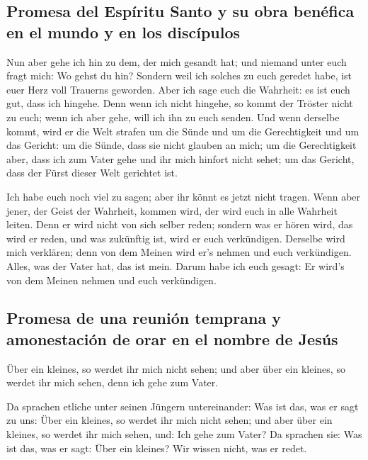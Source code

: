 \hypertarget{promesa-del-espuxedritu-santo-y-su-obra-benuxe9fica-en-el-mundo-y-en-los-discuxedpulos}{%
\subsection{Promesa del Espíritu Santo y su obra benéfica en el mundo y
en los
discípulos}\label{promesa-del-espuxedritu-santo-y-su-obra-benuxe9fica-en-el-mundo-y-en-los-discuxedpulos}}

 Nun aber gehe ich hin zu dem, der mich gesandt hat; und
niemand unter euch fragt mich: Wo gehst du hin?  Sondern
weil ich solches zu euch geredet habe, ist euer Herz voll Trauerns
geworden.  Aber ich sage euch die Wahrheit: es ist euch
gut, dass ich hingehe. Denn wenn ich nicht hingehe, so kommt der Tröster
nicht zu euch; wenn ich aber gehe, will ich ihn zu euch senden.
 Und wenn derselbe kommt, wird er die Welt strafen um die
Sünde und um die Gerechtigkeit und um das Gericht:  um die
Sünde, dass sie nicht glauben an mich;  um die
Gerechtigkeit aber, dass ich zum Vater gehe und ihr mich hinfort nicht
sehet;  um das Gericht, dass der Fürst dieser Welt
gerichtet ist.

 Ich habe euch noch viel zu sagen; aber ihr könnt es
jetzt nicht tragen.  Wenn aber jener, der Geist der
Wahrheit, kommen wird, der wird euch in alle Wahrheit leiten. Denn er
wird nicht von sich selber reden; sondern was er hören wird, das wird er
reden, und was zukünftig ist, wird er euch verkündigen. 
Derselbe wird mich verklären; denn von dem Meinen wird er's nehmen und
euch verkündigen.  Alles, was der Vater hat, das ist
mein. Darum habe ich euch gesagt: Er wird's von dem Meinen nehmen und
euch verkündigen.

\hypertarget{promesa-de-una-reuniuxf3n-temprana-y-amonestaciuxf3n-de-orar-en-el-nombre-de-jesuxfas}{%
\subsection{Promesa de una reunión temprana y amonestación de orar en el
nombre de
Jesús}\label{promesa-de-una-reuniuxf3n-temprana-y-amonestaciuxf3n-de-orar-en-el-nombre-de-jesuxfas}}

 Über ein kleines, so werdet ihr mich nicht sehen; und
aber über ein kleines, so werdet ihr mich sehen, denn ich gehe zum
Vater.

 Da sprachen etliche unter seinen Jüngern untereinander:
Was ist das, was er sagt zu uns: Über ein kleines, so werdet ihr mich
nicht sehen; und aber über ein kleines, so werdet ihr mich sehen, und:
Ich gehe zum Vater?  Da sprachen sie: Was ist das, was er
sagt: Über ein kleines? Wir wissen nicht, was er redet.

